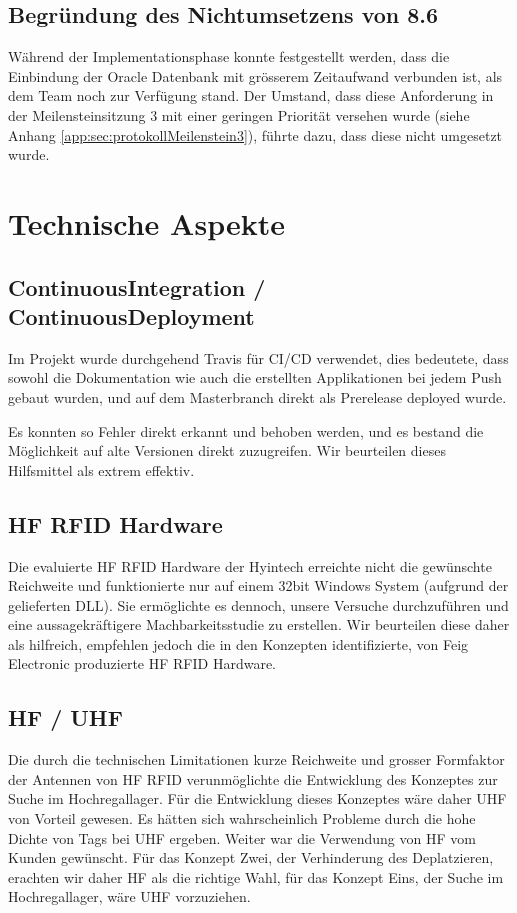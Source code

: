\subsection{Begründung des Nichtumsetzens von 8.6}
Während der Implementationsphase konnte festgestellt werden, dass die Einbindung der Oracle Datenbank mit grösserem Zeitaufwand verbunden ist, als dem Team noch zur Verfügung stand. Der Umstand, dass diese Anforderung in der Meilensteinsitzung 3 mit einer geringen Priorität versehen wurde (siehe Anhang \ref{app:sec:protokollMeilenstein3}), führte dazu, dass diese nicht umgesetzt wurde.

\section{Technische Aspekte}
\subsection{ContinuousIntegration / ContinuousDeployment}
Im Projekt wurde durchgehend Travis für CI/CD verwendet, dies bedeutete, dass sowohl die Dokumentation wie auch die erstellten Applikationen bei jedem Push gebaut wurden, und auf dem Masterbranch direkt als Prerelease deployed wurde.

Es konnten so Fehler direkt erkannt und behoben werden, und es bestand die Möglichkeit auf alte Versionen direkt zuzugreifen. Wir beurteilen dieses Hilfsmittel als extrem effektiv.

\subsection{HF RFID Hardware}
Die evaluierte \gls{HF} \gls{RFID} Hardware der Hyintech erreichte nicht die gewünschte Reichweite und funktionierte nur auf einem 32bit Windows System (aufgrund der gelieferten DLL). Sie ermöglichte es dennoch, unsere Versuche durchzuführen und eine aussagekräftigere Machbarkeitsstudie zu erstellen. Wir beurteilen diese daher als hilfreich, empfehlen jedoch die in den Konzepten identifizierte, von Feig Electronic produzierte \gls{HF} \gls{RFID} Hardware.

\subsection{HF / UHF}
Die durch die technischen Limitationen kurze Reichweite und grosser Formfaktor der Antennen von \gls{HF} \gls{RFID} verunmöglichte die Entwicklung des Konzeptes zur Suche im Hochregallager. Für die Entwicklung dieses Konzeptes wäre daher \gls{UHF} von Vorteil gewesen. Es hätten sich wahrscheinlich Probleme durch die hohe Dichte von Tags bei \gls{UHF} ergeben. Weiter war die Verwendung von \gls{HF} vom Kunden gewünscht. Für das Konzept Zwei, der Verhinderung des Deplatzieren, erachten wir daher \gls{HF} als die richtige Wahl, für das Konzept Eins, der Suche im Hochregallager, wäre \gls{UHF} vorzuziehen.

